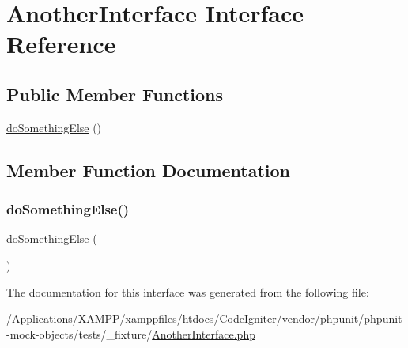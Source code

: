 \hypertarget{interface_another_interface}{}\section{Another\+Interface Interface Reference}
\label{interface_another_interface}
\subsection*{Public Member Functions}
\begin{DoxyCompactItemize}
\item 
\mbox{\hyperlink{interface_another_interface_a01b5414a947d9d500c188a27b574d16f}{do\+Something\+Else}} ()
\end{DoxyCompactItemize}


\subsection{Member Function Documentation}
\mbox{\label{interface_another_interface_a01b5414a947d9d500c188a27b574d16f}} 
\subsubsection{\texorpdfstring{do\+Something\+Else()}{doSomethingElse()}}
{\footnotesize\ttfamily do\+Something\+Else (\begin{DoxyParamCaption}{ }\end{DoxyParamCaption})}



The documentation for this interface was generated from the following file\+:\begin{DoxyCompactItemize}
\item 
/\+Applications/\+X\+A\+M\+P\+P/xamppfiles/htdocs/\+Code\+Igniter/vendor/phpunit/phpunit-\/mock-\/objects/tests/\+\_\+fixture/\mbox{\hyperlink{_another_interface_8php}{Another\+Interface.\+php}}\end{DoxyCompactItemize}
